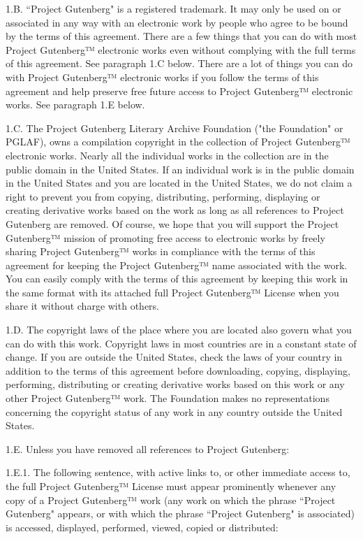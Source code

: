 {1.B. “Project Gutenberg" is a registered trademark. It may only be
used on or associated in any way with an electronic work by people who
agree to be bound by the terms of this agreement. There are a few
things that you can do with most Project Gutenberg™ electronic works
even without complying with the full terms of this agreement. See
paragraph 1.C below. There are a lot of things you can do with Project
Gutenberg™ electronic works if you follow the terms of this agreement
and help preserve free future access to Project Gutenberg™ electronic
works. See paragraph 1.E below.

1.C. The Project Gutenberg Literary Archive Foundation ("the Foundation"
or PGLAF), owns a compilation copyright in the collection of Project
Gutenberg™ electronic works. Nearly all the individual works in the
collection are in the public domain in the United States. If an
individual work is in the public domain in the United States and you are
located in the United States, we do not claim a right to prevent you from
copying, distributing, performing, displaying or creating derivative
works based on the work as long as all references to Project Gutenberg
are removed. Of course, we hope that you will support the Project
Gutenberg™ mission of promoting free access to electronic works by
freely sharing Project Gutenberg™ works in compliance with the terms of
this agreement for keeping the Project Gutenberg™ name associated with
the work. You can easily comply with the terms of this agreement by
keeping this work in the same format with its attached full Project
Gutenberg™ License when you share it without charge with others.

1.D. The copyright laws of the place where you are located also govern
what you can do with this work. Copyright laws in most countries are in
a constant state of change. If you are outside the United States, check
the laws of your country in addition to the terms of this agreement
before downloading, copying, displaying, performing, distributing or
creating derivative works based on this work or any other Project
Gutenberg™ work. The Foundation makes no representations concerning
the copyright status of any work in any country outside the United
States.

1.E. Unless you have removed all references to Project Gutenberg:

1.E.1. The following sentence, with active links to, or other immediate
access to, the full Project Gutenberg™ License must appear prominently
whenever any copy of a Project Gutenberg™ work (any work on which the
phrase “Project Gutenberg" appears, or with which the phrase “Project
Gutenberg" is associated) is accessed, displayed, performed, viewed,
copied or distributed:

}
